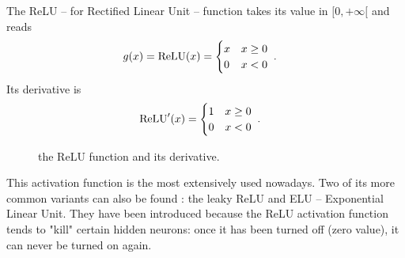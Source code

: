 The ReLU -- for Rectified Linear Unit -- function takes its value in $[0,+\infty[$ and reads
\begin{align}
g(x)&={\rm ReLU}(x)=\begin{cases} 
      x & x\geq 0 \\
      0& x<0 
   \end{cases}\;.
\end{align}
Its derivative is
\begin{align}
{\rm ReLU}'(x)&=\begin{cases} 
      1 & x\geq 0 \\
      0 & x<0 
   \end{cases}\;.
\end{align}

\begin{figure}[H]
\begin{center}
\end{center}
\caption{\label{fig:relu} the ReLU function and its derivative.}
\end{figure}


This activation function is the most extensively used nowadays. Two of its more common variants can also be found : the leaky ReLU and ELU -- Exponential Linear Unit. They have been introduced because the ReLU activation function tends to "kill" certain hidden neurons: once it has been turned off (zero value), it can never be turned on again.



